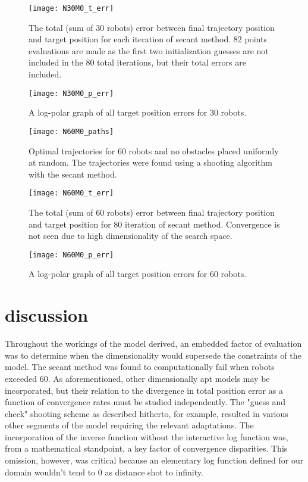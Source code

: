 \documentclass[11pt]{article}
\begin{document}
\begin{figure}
	\centering
	\texttt{[image: N30M0\_t\_err]}
	\caption{The total (sum of 30 robots) error between final trajectory position and target position for each iteration of secant method. 82 points evaluations are made as the first two initialization guesses are not included in the 80 total iterations, but their total errors are included.}
	\label{fig:n30m0-t-err}
\end{figure}

\begin{figure}
	\centering
	\texttt{[image: N30M0\_p\_err]}
	\caption{A log-polar graph of all target position errors for 30 robots.}
	\label{fig:n30m0-p-err}
\end{figure}

\begin{figure}
	\centering
	\texttt{[image: N60M0\_paths]}
	\caption{Optimal trajectories for 60 robots and no obstacles placed uniformly at random. The trajectories were found using a shooting algorithm with the secant method.}
	\label{fig:n60m0-paths}
\end{figure}

\begin{figure}
	\centering
	\texttt{[image: N60M0\_t\_err]}
	\caption{The total (sum of 60 robots) error between final trajectory position and target position for 80 iteration of secant method. Convergence is not seen due to high dimensionality of the search space.}
	\label{fig:n60m0-t-err}
\end{figure}

\begin{figure}
	\centering
	\texttt{[image: N60M0\_p\_err]}
	\caption{A log-polar graph of all target position errors for 60 robots.}
	\label{fig:n60m0-p-err}
\end{figure}

\section{discussion}
Throughout the workings of the model derived, an embedded factor of evaluation was to determine when the dimensionality would supersede the constraints of the model. The secant method was found to computationally fail when robots exceeded 60. As aforementioned, other dimensionally apt models may be incorporated, but their relation to the divergence in total position error as a function of convergence rates must be studied independently. The "guess and check" shooting scheme as described hitherto, for example, resulted in various other segments of the model requiring the relevant adaptations. The incorporation of the inverse function without the interactive log function was, from a mathematical standpoint, a key factor of convergence disparities. This omission, however, was critical because an elementary log function defined for our domain wouldn't tend to 0 as distance shot to infinity. 
\end{document}
